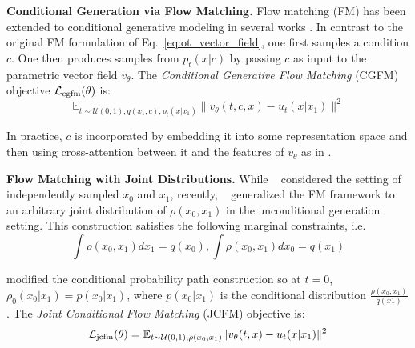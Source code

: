 \noindent \textbf{Conditional Generation via Flow Matching.} \quad Flow matching (FM) has been extended to conditional generative modeling in several works \citep{zheng2023guidedflowsgenerativemodeling, dao2023flowmatchinglatentspace,atanackovic2024metaflowmatchingintegrating, isobe2024extendedflowmatchingmethod}. In contrast to the original FM formulation of Eq.~\ref{eq:ot_vector_field}, one first samples a condition $c$. One then produces samples from $p_t(x | c)$ by passing $c$ as input to the parametric vector field $v_\theta$. The \emph{Conditional Generative Flow Matching} (CGFM) objective ${\mathcal{L}}_{\rm cgfm}(\theta)$ is: 
\begin{equation}\label{eq_conditional_generative_fm_objective}
    \mathbb{E}_{t\sim \mathcal{U}(0,1), q(x_1, c), \rho_t(x | x_1)} \|v_\theta(t, c, x) - u_t(x | x_1)\|^2
\end{equation}

In practice, $c$ is incorporated by embedding it into some representation space and then using cross-attention between it and the features of $v_\theta$ as in \cite{rombach2022high}.  


\noindent \textbf{Flow Matching with Joint Distributions.} \quad \label{sec_joint_flow_matching}
While ~\cite{lipman2022flow} considered the setting of independently sampled $x_0$ and $x_1$, recently, ~\cite{pooladian2023multisample, tong2023improving} generalized the FM framework to an arbitrary joint distribution of $\rho(x_0, x_1)$ in the unconditional generation setting. This construction satisfies the following marginal constraints, i.e.
\begin{equation}
    \int \rho(x_0, x_1)dx_1 = q(x_0), \int \rho(x_0, x_1)dx_0 = q(x_1)
\end{equation}

\citet{pooladian2023multisample} modified the conditional probability path construction so at $t=0$, $\rho_0(x_0|x_1) = p(x_0|x_1)$, 
where $p(x_0|x_1)$ is the conditional distribution $\frac{\rho(x_0,x_1)}{q(x1)}$. 
The \emph{Joint Conditional Flow Matching} (JCFM) objective is:
\begin{equation}
    {\mathcal{L}}_{\rm jcfm}(\theta) = \mathbb{E}_{t\sim \mathcal{U}(0,1), \rho(x_0,x_1)} \|v_\theta(t, x) - u_t(x | x_1)\|^2
\end{equation}




